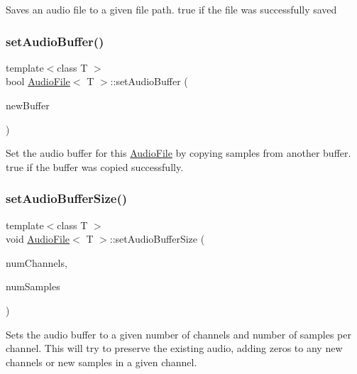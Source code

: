 Saves an audio file to a given file path.  true if the file was successfully saved \mbox{\label{class_audio_file_afa0a0f7d576b0597c938c5a89746636e}} 
\subsubsection{\texorpdfstring{set\+Audio\+Buffer()}{setAudioBuffer()}}
{\footnotesize\ttfamily template$<$class T $>$ \\
bool \hyperlink{class_audio_file}{Audio\+File}$<$ T $>$\+::set\+Audio\+Buffer (\begin{DoxyParamCaption}\item[{Audio\+Buffer \&}]{new\+Buffer }\end{DoxyParamCaption})}

Set the audio buffer for this \hyperlink{class_audio_file}{Audio\+File} by copying samples from another buffer.  true if the buffer was copied successfully. \mbox{\label{class_audio_file_ac155ed12db0f3b02011a7d75b525e71a}} 
\subsubsection{\texorpdfstring{set\+Audio\+Buffer\+Size()}{setAudioBufferSize()}}
{\footnotesize\ttfamily template$<$class T $>$ \\
void \hyperlink{class_audio_file}{Audio\+File}$<$ T $>$\+::set\+Audio\+Buffer\+Size (\begin{DoxyParamCaption}\item[{int}]{num\+Channels,  }\item[{int}]{num\+Samples }\end{DoxyParamCaption})}

Sets the audio buffer to a given number of channels and number of samples per channel. This will try to preserve the existing audio, adding zeros to any new channels or new samples in a given channel. \mbox{\label{class_audio_file_a2adf2ea23e7daeb8401e717c1b3d874b}} 
